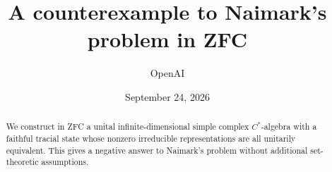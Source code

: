 \documentclass[11pt]{article}
\title{A counterexample to Naimark's problem in ZFC}
\author{OpenAI}
\date{September 24, 2026}
\numberwithin{equation}{section}
\theoremstyle{definition}
\begin{document}
\maketitle
\begin{abstract}
We construct in ZFC a unital infinite-dimensional simple complex
$C^*$-algebra with a faithful tracial state whose nonzero irreducible
representations are all unitarily equivalent. This gives a negative answer
to Naimark's problem without additional set-theoretic assumptions.
\end{abstract}
\tableofcontents
\clearpage






{\small


}
\end{document}
